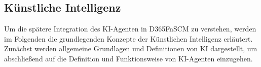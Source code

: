 \subsection{Künstliche Intelligenz}
Um die spätere Integration des \ac{KI}-Agenten in \ac{D365FnSCM} zu verstehen, werden im Folgenden die grundlegenden Konzepte der Künstlichen Intelligenz erläutert. Zunächst werden allgemeine Grundlagen und Definitionen von \ac{KI} dargestellt, um abschließend auf die Definition und Funktionsweise von \ac{KI}-Agenten einzugehen.


